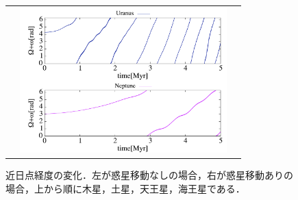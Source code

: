 \documentclass[11pt,a4paper,oneside,onecolumn]{jreport}
\begin{document}
\begin{figure}[H]
\begin{tabular}{ccc}
\begin{minipage}[t]{0.1\hsize}
\end{minipage} &
\begin{minipage}[t]{0.45\hsize}
\centering
\includegraphics[width=8cm]{./image/Move500kyr_curlypi_5Myr_URANEP.pdf}
\end{minipage}
%
\end{tabular}
\caption{近日点経度の変化．左が惑星移動なしの場合，右が惑星移動ありの場合，上から順に木星，土星，天王星，海王星である．\label{fig:varpi}}
\end{figure}
\end{document}
